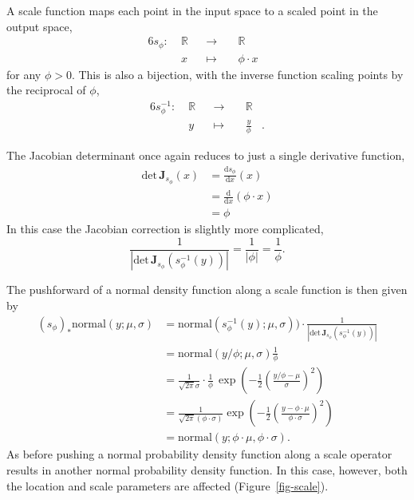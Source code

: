 \documentclass[
  letterpaper,
  DIV=11,
  numbers=noendperiod]{scrartcl}
\begin{document}
A scale function maps each point in the input space to a scaled point in
the output space, \begin{alignat*}{6}
s_{\phi} :\; & \mathbb{R} & &\rightarrow& \; & \mathbb{R} &
\\
& x & &\mapsto& & \phi \cdot x &
\end{alignat*} for any \(\phi > 0\). This is also a bijection, with the
inverse function scaling points by the reciprocal of \(\phi\),
\begin{alignat*}{6}
s_{\phi}^{-1} :\; & \mathbb{R} & &\rightarrow& \; & \mathbb{R} &
\\
& y & &\mapsto& & \frac{y}{\phi} &.
\end{alignat*}

The Jacobian determinant once again reduces to just a single derivative
function, \begin{align*}
\mathrm{det} \, \mathbf{J}_{s_{\phi}}(x)
&= \frac{ \mathrm{d} s_{\phi} }{ \mathrm{d} x }(x)
\\
&= \frac{ \mathrm{d} }{ \mathrm{d} x } ( \phi \cdot x )
\\
&= \phi
\end{align*} In this case the Jacobian correction is slightly more
complicated, \[
\frac{1}{| \mathrm{det} \, \mathbf{J}_{s_{\phi}}(s_{\phi}^{-1}(y)) |}
=
\frac{1}{ | \phi | }
=
\frac{1}{ \phi }.
\]

The pushforward of a normal density function along a scale function is
then given by \begin{align*}
(s_{\phi})_{*} \mathrm{normal}(y; \mu, \sigma)
&=
\mathrm{normal}(s_{\phi}^{-1}(y); \mu, \sigma))
\cdot
\frac{1}{| \mathrm{det} \, \mathbf{J}_{s_{\phi}}(s_{\phi}^{-1}(y)) |}
\\
&=
\mathrm{normal}( y / \phi; \mu, \sigma) \frac{1}{\phi}
\\
&= \frac{1}{\sqrt{2 \pi} \sigma} \cdot \frac{1}{\phi} \,
\exp \left(
-\frac{1}{2} \left( \frac{ y / \phi - \mu}{\sigma} \right)^{2} \right)
\\
&= \frac{1}{\sqrt{2 \pi} (\phi \cdot \sigma)}
\exp \left(
-\frac{1}{2}
\left( \frac{ y - \phi \cdot \mu}{\phi \cdot \sigma} \right)^{2}
\right)
\\
&=
\mathrm{normal}(y; \phi \cdot \mu, \phi \cdot \sigma).
\end{align*} As before pushing a normal probability density function
along a scale operator results in another normal probability density
function. In this case, however, both the location and scale parameters
are affected (Figure~\ref{fig-scale}).
\end{document}
